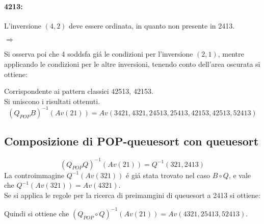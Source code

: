 \paragraph*{4213:} L'inversione $(4,2)$ deve essere ordinata, in quanto non presente in 2413.
\begin{center}
 $\Rightarrow$
\end{center}
Si osserva poi che 4 soddsfa gi\'a le condizioni per l'inversione $(2,1)$, mentre applicando le condizioni per le altre inversioni, tenendo conto dell'area oscurata si ottiene:
\begin{center}
\end{center}
Corrispondente ai pattern classici 42513, 42153.\\
Si uniscono i risultati ottenuti.
$$(Q_{POP}{B})^{-1}(Av(21)) = Av(3421, 4321, 24513, 25413, 42153, 42513, 52413)$$
\subsection*{Composizione di {POP-queuesort} con {queuesort}}
$$(Q_{POP}{Q})^{-1}(Av(21)) = Q^{-1}(321, 2413)$$
La controimmagine $Q^{-1}(Av(321))$ \'e gi\'a stata trovato nel caso $B\circ{Q}$, e vale che $Q^{-1}(Av(321)) = Av(4321)$.\\
Se si applica le regole per la ricerca di preimamgini di queuesort a 2413 si ottiene:
\begin{center}\end{center}
Quindi si ottiene che $(Q_{POP}\circ{Q})^{-1}(Av(21)) = Av(4321, 25413, 52413)$.
